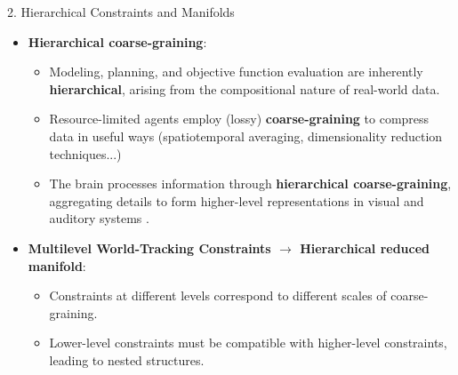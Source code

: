 \begin{frame}{2. Hierarchical Constraints and Manifolds\cite{ruffiniStructuredDynamicsAlgorithmic2023}}
    \begin{itemize}
        \item \textbf{Hierarchical coarse-graining}:
        \begin{itemize}
            \item Modeling, planning, and objective function evaluation are inherently \textbf{hierarchical}, arising from the compositional nature of real-world data.
            \item Resource-limited agents employ (lossy) \textbf{coarse-graining} to compress data in useful  ways \cite{ruffiniNavigatingComplexityHow2024} (spatiotemporal averaging, dimensionality reduction techniques...)
            \item The brain processes information through\textbf{ hierarchical coarse-graining}, aggregating details to form higher-level representations in visual and auditory systems \cite{dicarloHowDoesBrain2012,grill-spectorFunctionalArchitectureVentral2014,bizleyWhatWhereHow2013}.
        \end{itemize}
         \vfill
        \item \textbf{Multilevel World-Tracking Constraints $\longrightarrow$ Hierarchical reduced manifold}:
        \begin{itemize}
            \item Constraints at different levels correspond to different scales of coarse-graining.
            \item Lower-level constraints must be compatible with higher-level constraints, leading to nested structures.
        \end{itemize}
    \end{itemize}

\end{frame}

